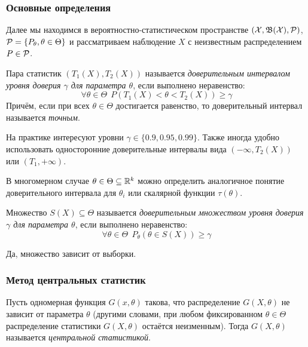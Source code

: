 \subsubsection{Основные определения}

\begin{note}
	Далее мы находимся в вероятностно-статистическом пространстве $(\mathcal{X}, \mathfrak{B}(\mathcal{X}), \mathcal{P})$, $\mathcal{P} = \{P_\theta, \theta \in \Theta\}$ и рассматриваем наблюдение $X$ с неизвестным распределением $P \in \mathcal{P}$.
\end{note}

\begin{definition}
	Пара статистик $(T_1(X), T_2(X))$ называется \textit{доверительным интервалом уровня доверия $\gamma$ для параметра $\theta$}, если выполнено неравенство:
	\[
		\forall \theta \in \Theta\ \ P(T_1(X) < \theta < T_2(X)) \ge \gamma
	\]
	Причём, если при всех $\theta \in \Theta$ достигается равенство, то доверительный интервал называется \textit{точным}.
\end{definition}

\begin{note}
	На практике интересуют уровни $\gamma \in \{0.9, 0.95, 0.99\}$. Также иногда удобно использовать односторонние доверительные интервалы вида $(-\infty, T_2(X))$ или $(T_1, +\infty)$.
\end{note}

\begin{note}
	В многомерном случае $\theta \in \Theta \subseteq \mathbb{R}^k$ можно определить аналогичное понятие доверительного интервала для $\theta_i$ или скалярной функции $\tau(\theta)$.
\end{note}

\begin{definition}
	Множество $S(X) \subseteq \Theta$ называется \textit{доверительным множеством уровня доверия $\gamma$ для параметра $\theta$}, если выполнено неравенство:
	\[
		\forall \theta \in \Theta\ \ P_\theta(\theta \in S(X)) \ge \gamma
	\]
\end{definition}

\begin{anote}
	Да, множество зависит от выборки.
\end{anote}

\subsubsection{Метод центральных статистик}

\begin{definition}
	Пусть одномерная функция $G(x, \theta)$ такова, что распределение $G(X, \theta)$ не зависит от параметра $\theta$ (другими словами, при любом фиксированном $\theta \in \Theta$ распределение статистики $G(X, \theta)$ остаётся неизменным). Тогда $G(X, \theta)$ называется \textit{центральной статистикой}.
\end{definition}

